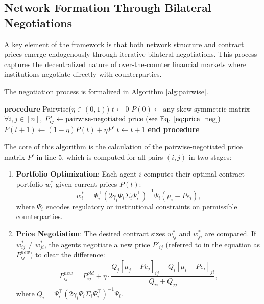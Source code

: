 \subsection{Network Formation Through Bilateral Negotiations}

A key element of the  framework is that both network structure and contract prices emerge endogenously through iterative bilateral negotiations. This process captures the decentralized nature of over-the-counter financial markets where institutions negotiate directly with counterparties.

The negotiation process is formalized in Algorithm \ref{alg:pairwise}.

\begin{algorithm}[H] %
\caption{Pairwise Negotiations from \protect{}}
\label{alg:pairwise}
\begin{algorithmic}[1] %
\STATE \textbf{procedure} Pairwise($\eta \in (0,1)$)
\STATE $t \leftarrow 0$
\STATE $P(0) \leftarrow \text{any skew-symmetric matrix}$
    \STATE $\forall i,j \in [n]$, $P'_{ij} \leftarrow \text{pairwise-negotiated price (see Eq. \ref{eq:price_neg})}$
    \STATE $P(t+1) \leftarrow (1 - \eta)P(t) + \eta P'$
    \STATE $t \leftarrow t+1$
\ENDWHILE
\STATE \textbf{end procedure}
\end{algorithmic}
\end{algorithm}

The core of this algorithm is the calculation of the pairwise-negotiated price matrix $P'$ in line 5, which is computed for all pairs $(i,j)$ in two stages:

\begin{enumerate}
    \item \textbf{Portfolio Optimization}: Each agent \( i \) computes their optimal contract portfolio \( w_i^* \) given current prices \( P(t) \):
    \begin{equation}
    \label{eq:portfolio_opt}
    w_i^* = \Psi_i^\top (2\gamma_i \Psi_i \Sigma_i \Psi_i^\top)^{-1} \Psi_i (\mu_i - P e_i),
    \end{equation}
    where \( \Psi_i \) encodes regulatory or institutional constraints on permissible counterparties.
    
    \item \textbf{Price Negotiation}: The desired contract sizes \( w_{ij}^* \) and \( w_{ji}^* \) are compared. If \( w_{ij}^* \neq w_{ji}^* \), the agents negotiate a new price \( P'_{ij} \) (referred to in the equation as \( P_{ij}^{new} \)) to clear the difference:
    \begin{equation}
    \label{eq:price_neg}
    P_{ij}^{new} = P_{ij}^{old} + \eta \cdot \frac{Q_j[\mu_j - P e_j]_{ij} - Q_i[\mu_i - P e_i]_{ji}}{Q_{ii} + Q_{jj}},
    \end{equation}
    where \( Q_i = \Psi_i^\top (2\gamma_i \Psi_i \Sigma_i \Psi_i^\top)^{-1} \Psi_i \).
\end{enumerate}

